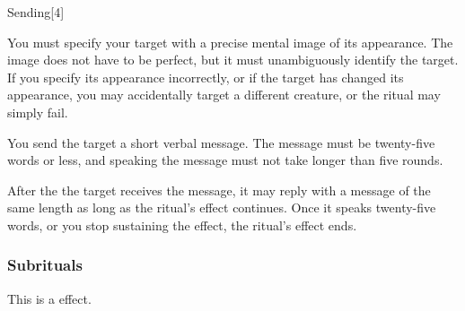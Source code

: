 \begin{spellsection}{Sending}[4]

\begin{spellcontent}

\begin{spelltargetinginfo}
\spellspecial
You must specify your target with a precise mental image of its appearance.
The image does not have to be perfect, but it must unambiguously identify the target.
If you specify its appearance incorrectly, or if the target has changed its appearance, you may accidentally target a different creature, or the ritual may simply fail.



\end{spelltargetinginfo}


\begin{spelleffects}



\spelleffect
You send the target a short verbal message.
The message must be twenty-five words or less, and speaking the message must not take longer than five rounds.

After the the target receives the message, it may reply with a message of the same length as long as the ritual's effect continues.
Once it speaks twenty-five words, or you stop sustaining the effect, the ritual's effect ends.






\end{spelleffects}

\end{spellcontent}
\begin{spellfooter}


\end{spellfooter}
\begin{spellsubcontent}


\end{spellsubcontent}
\end{spellsection}


\subsubsection{Subrituals}



This is a  effect.



